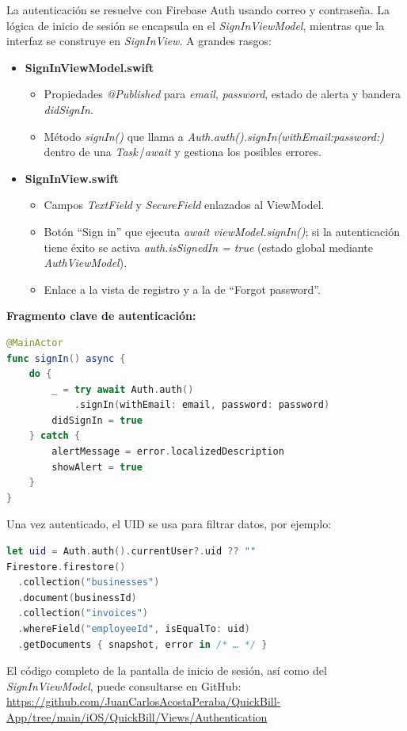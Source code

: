 \begin{large}

La autenticación se resuelve con Firebase Auth usando correo y contraseña. La lógica de inicio de sesión se  encapsula en el \textit{SignInViewModel}, mientras que la interfaz se construye en \textit{SignInView}. A grandes rasgos:

\begin{itemize}
  \item \textbf{SignInViewModel.swift}
    \begin{itemize}
      \item Propiedades \textit{@Published} para \textit{email}, \textit{password}, estado de alerta y bandera \textit{didSignIn}.
      \item Método \textit{signIn()} que llama a \textit{Auth.auth().signIn(withEmail:password:)} dentro de una \textit{Task}\,/\textit{await} y gestiona los posibles errores.
    \end{itemize}
  \item \textbf{SignInView.swift}
    \begin{itemize}
      \item Campos \textit{TextField} y \textit{SecureField} enlazados al ViewModel.
      \item Botón “Sign in” que ejecuta \textit{await viewModel.signIn()}; si la autenticación tiene éxito se activa \textit{auth.isSignedIn = true} (estado global mediante \textit{AuthViewModel}).
      \item Enlace a la vista de registro y a la de “Forgot password”.
    \end{itemize}
\end{itemize}

\noindent\textbf{Fragmento clave de autenticación:}
\begin{lstlisting}[language=swift, basicstyle=\ttfamily\small, caption={SignInViewModel.signIn()}]
@MainActor
func signIn() async {
    do {
        _ = try await Auth.auth()
            .signIn(withEmail: email, password: password)
        didSignIn = true
    } catch {
        alertMessage = error.localizedDescription
        showAlert = true
    }
}
\end{lstlisting}

\noindent Una vez autenticado, el UID se usa para filtrar datos, por ejemplo:

\begin{lstlisting}[language=swift, basicstyle=\ttfamily\small]
let uid = Auth.auth().currentUser?.uid ?? ""
Firestore.firestore()
  .collection("businesses")
  .document(businessId)
  .collection("invoices")
  .whereField("employeeId", isEqualTo: uid)
  .getDocuments { snapshot, error in /* … */ }
\end{lstlisting}

El código completo de la pantalla de inicio de sesión, así como del \textit{SignInViewModel}, puede consultarse en GitHub:
\url{https://github.com/JuanCarlosAcostaPeraba/QuickBill-App/tree/main/iOS/QuickBill/Views/Authentication}

\end{large}

